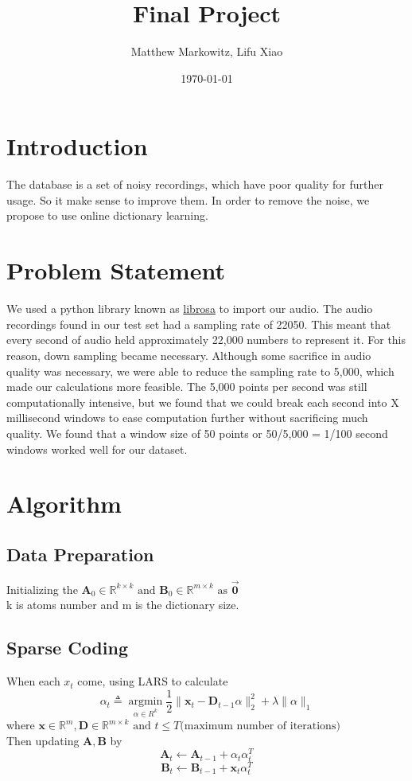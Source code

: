 \documentclass[UTF8]{article}
\title{Final Project}
\author{Matthew Markowitz, Lifu Xiao}
\date{\today}
\begin{document}
    \maketitle
    \section{Introduction}
    The database is a set of noisy recordings, which have poor quality for further usage. So it make sense  to improve them. In order to remove the noise, we propose to use online dictionary learning.

    \section{Problem Statement}
    We used a python library known as \href{https://librosa.github.io/librosa/}{librosa} to import our audio. The audio recordings found in our test set had a sampling rate of 22050. This meant that every second of audio held approximately 22,000 numbers to represent it. For this reason, down sampling became necessary. Although some sacrifice in audio quality was necessary, we were able to reduce the sampling rate to 5,000, which made our calculations more feasible. The 5,000 points per second was still computationally intensive, but we found that we could break each second into X millisecond windows to ease computation further without sacrificing much quality. We found that a window size of 50 points or 50/5,000 = 1/100 second windows worked well for our dataset.

    \section{Algorithm}

    \subsection{Data Preparation}

    Initializing the $\bm{A}_0 \in \mathbb{R}^{k \times k} \text{ and } \bm{B}_0 \in \mathbb{R}^{m \times k} \text{ as } \vec{\bm{0}} $\\
    k is atoms number and m is the dictionary size.

    \subsection{Sparse Coding}
    When each $x_t$ come, using LARS to calculate
    \[
        \alpha_t \triangleq \mathop{\arg\min}\limits_{\alpha\in R^k} \frac{1}{2} \| \bm{x}_t - \bm{D}_{t-1} \alpha  \|^2_2 + \lambda \|\alpha\|_1
    \]
    where $\bm{x} \in \mathbb{R}^{m}, \bm{D} \in \mathbb{R}^{m \times k} \text{ and } t \leq T \text{(maximum number of iterations)}$
    \\
    Then updating $\bm{A}, \bm{B}$ by
    \[\bm{A}_t \leftarrow \bm{A}_{t-1} + \alpha_t \alpha_t^T\]
    \[\bm{B}_t \leftarrow \bm{B}_{t-1} + \bm{x}_t \alpha_t^T\]
    
\end{document}
